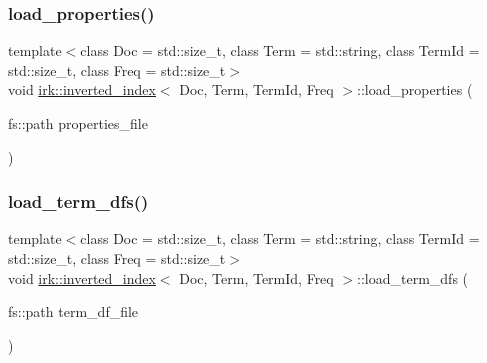 \mbox{\label{classirk_1_1inverted__index_a592cccf4d8b77906e33e90b09f9dec7a}} 
\subsubsection{\texorpdfstring{load\+\_\+properties()}{load\_properties()}}
{\footnotesize\ttfamily template$<$class Doc  = std\+::size\+\_\+t, class Term  = std\+::string, class Term\+Id  = std\+::size\+\_\+t, class Freq  = std\+::size\+\_\+t$>$ \\
void \mbox{\hyperlink{classirk_1_1inverted__index}{irk\+::inverted\+\_\+index}}$<$ Doc, Term, Term\+Id, Freq $>$\+::load\+\_\+properties (\begin{DoxyParamCaption}\item[{fs\+::path}]{properties\+\_\+file }\end{DoxyParamCaption})\hspace{0.3cm}{\ttfamily [inline]}}

\mbox{\label{classirk_1_1inverted__index_a3c9012991057b448f113bad80d344d68}} 
\subsubsection{\texorpdfstring{load\+\_\+term\+\_\+dfs()}{load\_term\_dfs()}}
{\footnotesize\ttfamily template$<$class Doc  = std\+::size\+\_\+t, class Term  = std\+::string, class Term\+Id  = std\+::size\+\_\+t, class Freq  = std\+::size\+\_\+t$>$ \\
void \mbox{\hyperlink{classirk_1_1inverted__index}{irk\+::inverted\+\_\+index}}$<$ Doc, Term, Term\+Id, Freq $>$\+::load\+\_\+term\+\_\+dfs (\begin{DoxyParamCaption}\item[{fs\+::path}]{term\+\_\+df\+\_\+file }\end{DoxyParamCaption})\hspace{0.3cm}{\ttfamily [inline]}}

\mbox{\label{classirk_1_1inverted__index_af26ea157a030b67feff19878afbacbdd}} 
